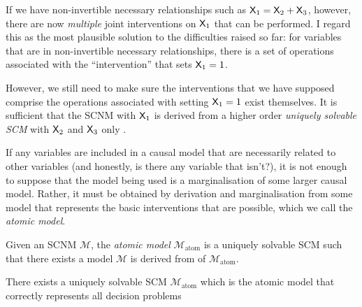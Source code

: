 If we have non-invertible necessary relationships such as $\mathsf{X}_1 = \mathsf{X}_2 + \mathsf{X}_3$, however, there are now \emph{multiple} joint interventions on $\mathsf{X}_1$ that can be performed. I regard this as the most plausible solution to the difficulties raised so far: for variables that are in non-invertible necessary relationships, there is a set of operations associated with the ``intervention'' that sets $\mathsf{X}_1=1$.

However, we still need to make sure the interventions that we have supposed comprise the operations associated with setting $\mathsf{X}_1=1$ exist themselves. It is sufficient that the SCNM with $\mathsf{X}_1$ is derived from a higher order \emph{uniquely solvable SCM} with $\mathsf{X}_2$ and $\mathsf{X}_3$ only .


If any variables are included in a causal model that are necessarily related to other variables (and honestly, is there any variable that isn't?), it is not enough to suppose that the model being used is a marginalisation of some larger causal model. Rather, it must be obtained by derivation and marginalisation from some model that represents the basic interventions that are possible, which we call the \emph{atomic model}.

\begin{definition}
Given an SCNM $\mathcal{M}$, the \emph{atomic model} $\mathcal{M}_{\text{atom}}$ is a uniquely solvable SCM such that there exists a model $\mathcal{M}$ is derived from of $\mathcal{M}_{\text{atom}}$.
\end{definition}


\begin{definition}
There exists a uniquely solvable SCM $\mathcal{M}_{\text{atom}}$ which is the atomic model that correctly represents  all decision problems 
\end{definition}


